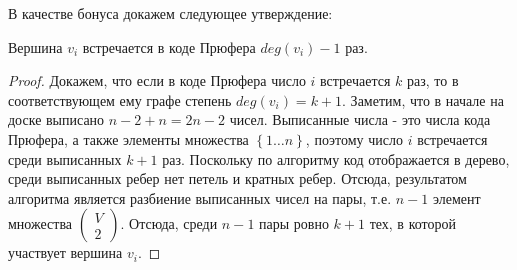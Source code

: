 \bigskip

В качестве бонуса докажем следующее утверждение:

\begin{prop}
Вершина $v_i$ встречается в коде Прюфера $deg(v_i) - 1$ раз.
\end{prop}

\begin{proof}
Докажем, что если в коде Прюфера число $i$ встречается $k$ раз, то в соответствующем ему графе степень $deg(v_i) = k + 1$. Заметим, что в начале на доске выписано $n-2 + n = 2n - 2$ чисел. Выписанные числа - это числа кода Прюфера, а также элементы множества $\left\lbrace 1… n\right\rbrace$, поэтому число $i$ встречается среди выписанных $k+1$ раз. Поскольку по алгоритму код отображается в дерево, среди выписанных ребер нет петель и кратных ребер. Отсюда, результатом алгоритма является разбиение выписанных чисел на пары, т.\:е. $n - 1$ элемент множества $\left(\begin{array}{c} V \\ 2\end{array}\right)$. Отсюда, среди $n-1$ пары ровно $k+1$ тех, в которой участвует вершина $v_i$. 
\end{proof}
